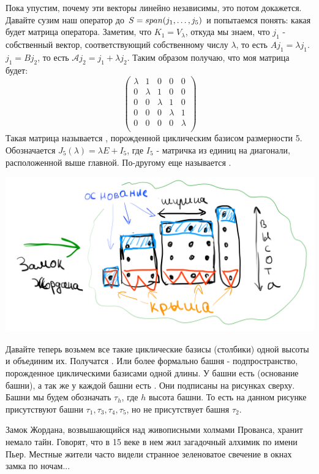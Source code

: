 Пока упустим, почему эти векторы линейно независимы, это потом докажется. Давайте сузим наш оператор до $S = span (j_1,\ldots,j_5)$ и попытаемся понять: какая будет матрица оператора. Заметим, что $K_1 = V_\lambda$, откуда мы знаем, что $j_1$ - собственный вектор, соответствующий собственному числу $\lambda$, то есть $Aj_1 = \lambda j_1$. $j_1 = Bj_2$, то есть $\mathcal{A} j_2 = j_1 +\lambda j_2$. Таким образом получаю, что моя матрица будет:
$$
\begin{pmatrix}
 \lambda & 1 & 0 & 0 & 0 \\
 0 &\lambda & 1 & 0 & 0\\
 0 &0 &\lambda & 1 & 0 \\
 0 &0 & 0 &\lambda & 1  \\
 0 &0 &0 & 0 & \lambda \\
\end{pmatrix}
$$
Такая матрица называется  , порожденной циклическим базисом  размерности 5. Обозначается $J_5(\lambda) = \lambda E+I_5$, где $I_5$ - матричка из единиц на диагонали, расположенной выше главной. По-другому еще называется .
\begin{center}
   \includegraphics[width = 15cm]{assets/7_9-zhordan-castle.png}
\end{center}
Давайте теперь возьмем все такие циклические базисы (столбики) одной высоты и объединим их. Получатся . Или более формально башня - подпространство, порожденное циклическими базисами одной длины. У башни есть  (основание башни), а так же у каждой башни есть .  Они подписаны на рисунках сверху. Башни мы будем обозначать $\tau_h$, где $h$ высота башни. То есть на данном рисунке присутствуют башни $\tau_1,\tau_3,\tau_4,\tau_5$, но не присутствует башня $\tau_2$. 

Замок Жордана, возвышающийся над живописными холмами Прованса, хранит немало тайн. Говорят, что в 15 веке в нем жил загадочный алхимик по имени Пьер. Местные жители часто видели странное зеленоватое свечение в окнах замка по ночам... 

